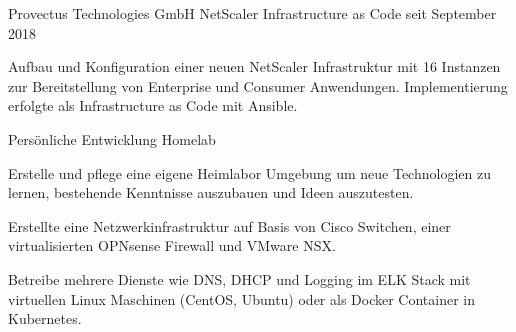 


\begin{cventries}


\cventry
{Provectus Technologies GmbH} %
{NetScaler Infrastructure as Code} %
{} %
{seit September 2018} %
{ %
\begin{cvitems}
\item {Aufbau und Konfiguration einer neuen NetScaler Infrastruktur mit 16 Instanzen zur Bereitstellung von Enterprise und Consumer Anwendungen. Implementierung erfolgte als Infrastructure as Code mit Ansible.}
\end{cvitems}
}

\cventry
{Persönliche Entwicklung} %
{Homelab} %
{} %
{} %
{ %
{Erstelle und pflege eine eigene Heimlabor Umgebung um neue Technologien zu lernen, bestehende Kenntnisse auszubauen und Ideen auszutesten.}
\begin{cvitems}
\item {}
\item {Erstellte eine Netzwerkinfrastruktur auf Basis von Cisco Switchen, einer virtualisierten OPNsense Firewall und VMware NSX.}
\item {Betreibe mehrere Dienste wie DNS, DHCP und Logging im ELK Stack mit virtuellen Linux Maschinen (CentOS, Ubuntu) oder als Docker Container in Kubernetes. }
\end{cvitems}
}



\end{cventries}
